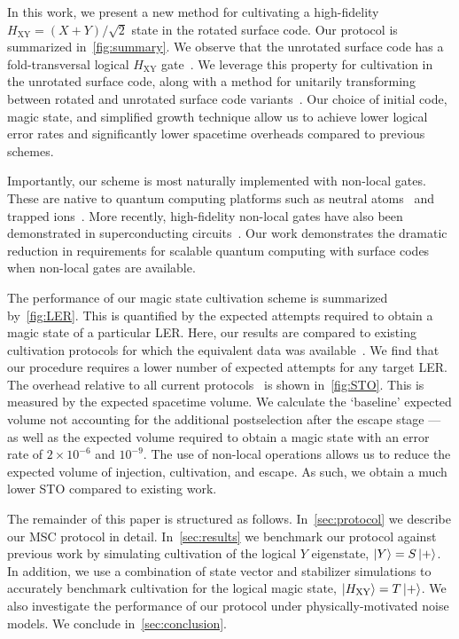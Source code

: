\documentclass[%
    aps, 
    physrev,
    reprint,
]{revtex4-2}
\newcommand{\XY}{_\mathrm{XY}}
\begin{document}
In this work, we present a new method for cultivating a high-fidelity $H\XY = (X+Y)/\sqrt{2}$ state in the rotated surface code.
Our protocol is summarized in~\cref{fig:summary}. 
We observe that the unrotated surface code has a fold-transversal logical $H\XY$ gate~\cite{kubica2015unfolding,moussa2016transversal}. 
We leverage this property for cultivation in the unrotated surface code, along with a method for unitarily transforming between rotated and unrotated surface code variants~\cite{tsai2025unitary}.  
Our choice of initial code, magic state, and simplified growth technique allow us to achieve lower logical error rates and significantly lower spacetime overheads compared to previous schemes. 

Importantly, our scheme is most naturally implemented with non-local gates.
These are native to quantum computing platforms such as neutral atoms~\cite{bluvstein2024logical} and trapped ions~\cite{moses2023racetrack}. 
More recently, high-fidelity non-local gates have also been demonstrated in superconducting circuits~\cite{wang2025demonstration,qldpc2025cross}. 
Our work demonstrates the dramatic reduction in requirements for scalable quantum computing with surface codes when non-local gates are available. 

The performance of our magic state cultivation scheme is summarized by~\cref{fig:LER}.
This is quantified by the expected attempts required to obtain a magic state of a particular LER.
Here, our results are compared to existing
cultivation protocols for which the equivalent data was available~\cite{gidney2024magic,chen2025efficient}.
We find that our procedure requires a lower number of expected attempts for any target LER.
The overhead relative to all current protocols~\cite{gidney2024magic,chen2025efficient,vaknin2025magic,claes2025cultivatingtstatessurface} is shown in~\cref{fig:STO}.
This is measured by the expected spacetime volume.
We calculate the `baseline' expected volume not accounting for the additional postselection after the escape stage --- as well as the expected volume required to obtain a magic state with an error rate of $2 \times 10^{-6}$ and $10^{-9}$.
The use of non-local operations allows us to reduce the expected volume
of injection, cultivation, and escape.
As such, we obtain a much lower STO compared to existing work.

The remainder of this paper is structured as follows.
In~\cref{sec:protocol} we describe our MSC protocol in detail.
In~\cref{sec:results} we benchmark our protocol against previous work by simulating cultivation of the logical $Y$ eigenstate, $\ket{Y} = S\ket{+}$.
In addition, we use a combination of
state vector and stabilizer simulations to accurately benchmark cultivation for the {logical magic state}, $\ket{H\XY} = T\ket{+}$.
We also investigate the performance of our protocol under physically-motivated noise models.
We conclude in~\cref{sec:conclusion}.
\end{document}
